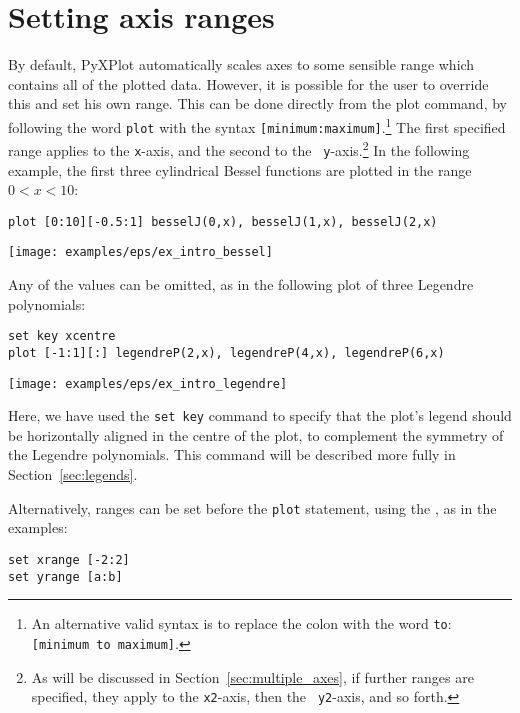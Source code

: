 \section{Setting axis ranges}
\label{sec:plot_ranges}

By default, PyXPlot automatically scales axes to some sensible range which
contains all of the plotted data. However, it is possible for the user to
override this and set his own range. This can be
done directly from the plot command, by following the word {\tt plot} with the
syntax {\tt [minimum:maximum]}.\footnote{An alternative valid syntax is to
replace the colon with the word {\tt to}: {\tt [minimum to maximum]}.} The
first specified range applies to the {\tt x}-axis, and the second to the {\tt
y}-axis.\footnote{As will be discussed in Section~\ref{sec:multiple_axes}, if
further ranges are specified, they apply to the {\tt x2}-axis, then the {\tt
y2}-axis, and so forth.} In the following example, the first three cylindrical
Bessel functions are plotted in the range $0<x<10$:

\begin{verbatim}
plot [0:10][-0.5:1] besselJ(0,x), besselJ(1,x), besselJ(2,x)
\end{verbatim}
\begin{center}
\texttt{[image: examples/eps/ex\_intro\_bessel]}
\end{center}

\noindent Any of the values can be omitted, as in the following plot of
three Legendre polynomials:

\begin{verbatim}
set key xcentre
plot [-1:1][:] legendreP(2,x), legendreP(4,x), legendreP(6,x)
\end{verbatim}
\begin{center}
\texttt{[image: examples/eps/ex\_intro\_legendre]}
\end{center}

\noindent Here, we have used the {\tt set key} command to specify that the
plot's legend should be horizontally aligned in the centre of the plot, to
complement the symmetry of the Legendre polynomials. This command will be
described more fully in Section~\ref{sec:legends}.

Alternatively, ranges can be set before the {\tt plot} statement, using the
, as in the examples:

\begin{verbatim}
set xrange [-2:2]
set yrange [a:b]
\end{verbatim}


